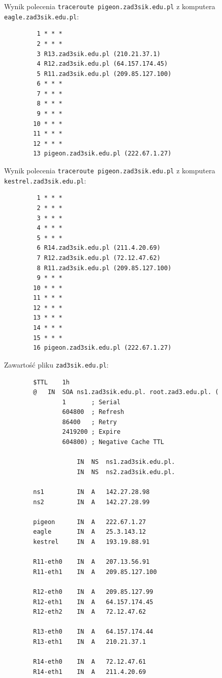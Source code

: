 \documentclass[12pt]{article}
\begin{document}
	\medskip
	
	Wynik polecenia \texttt{traceroute pigeon.zad3sik.edu.pl} z komputera
	\texttt{eagle.zad3sik.edu.pl}:
	\begin{verbatim}
		 1 * * *
		 2 * * *
		 3 R13.zad3sik.edu.pl (210.21.37.1)
		 4 R12.zad3sik.edu.pl (64.157.174.45)
		 5 R11.zad3sik.edu.pl (209.85.127.100)
		 6 * * *
		 7 * * *
		 8 * * *
		 9 * * *
		10 * * *
		11 * * *
		12 * * *
		13 pigeon.zad3sik.edu.pl (222.67.1.27)
	\end{verbatim}
	
	\medskip
	
	Wynik polecenia \texttt{traceroute pigeon.zad3sik.edu.pl} z komputera
	\texttt{kestrel.zad3sik.edu.pl}:
	\begin{verbatim}
		 1 * * *
		 2 * * *
		 3 * * *
		 4 * * *
		 5 * * *
		 6 R14.zad3sik.edu.pl (211.4.20.69)
		 7 R12.zad3sik.edu.pl (72.12.47.62)
		 8 R11.zad3sik.edu.pl (209.85.127.100)
		 9 * * *
		10 * * *
		11 * * *
		12 * * *
		13 * * *
		14 * * *
		15 * * *
		16 pigeon.zad3sik.edu.pl (222.67.1.27)
	\end{verbatim}
	
	\medskip
	
	Zawartość pliku \texttt{zad3sik.edu.pl}:
	\begin{verbatim}
		$TTL    1h
		@   IN  SOA ns1.zad3sik.edu.pl. root.zad3.edu.pl. (
		        1       ; Serial
		        604800  ; Refresh
		        86400   ; Retry
		        2419200 ; Expire
		        604800) ; Negative Cache TTL
		
		            IN  NS  ns1.zad3sik.edu.pl.
		            IN  NS  ns2.zad3sik.edu.pl.
		
		ns1         IN  A   142.27.28.98
		ns2         IN  A   142.27.28.99
		
		pigeon      IN  A   222.67.1.27
		eagle       IN  A   25.3.143.12
		kestrel     IN  A   193.19.88.91
		
		R11-eth0    IN  A   207.13.56.91
		R11-eth1    IN  A   209.85.127.100
		
		R12-eth0    IN  A   209.85.127.99
		R12-eth1    IN  A   64.157.174.45
		R12-eth2    IN  A   72.12.47.62
		
		R13-eth0    IN  A   64.157.174.44
		R13-eth1    IN  A   210.21.37.1
		
		R14-eth0    IN  A   72.12.47.61
		R14-eth1    IN  A   211.4.20.69
	\end{verbatim}
\end{document}
